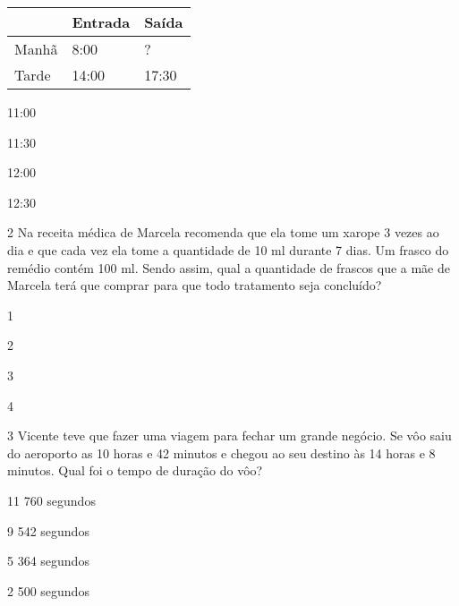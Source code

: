 \begin{longtable}[]{@{}lll@{}}
\toprule
& Entrada & Saída\tabularnewline
\midrule
\endhead
Manhã & 8:00 & ?\tabularnewline
Tarde & 14:00 & 17:30\tabularnewline
\bottomrule
\end{longtable}

\begin{escolha}
\item
  11:00
\item
  11:30
\item
  12:00
\item
  12:30
\end{escolha}


\num{2} Na receita médica de Marcela recomenda que ela tome um xarope 3
vezes ao dia e que cada vez ela tome a quantidade de 10 ml durante 7
dias. Um frasco do remédio contém 100 ml. Sendo assim, qual a quantidade
de frascos que a mãe de Marcela terá que comprar para que todo
tratamento seja concluído?

\begin{escolha}
\item
  1
\item
  2
\item
  3
\item
  4
\end{escolha}


\num{3} Vicente teve que fazer uma viagem para fechar um grande negócio. Se
vôo saiu do aeroporto as 10 horas e 42 minutos e chegou ao seu destino
às 14 horas e 8 minutos. Qual foi o tempo de duração do vôo?

\begin{escolha}
\item
  11 760 segundos
\item
  9 542 segundos
\item
  5 364 segundos
\item
  2 500 segundos
\end{escolha}


